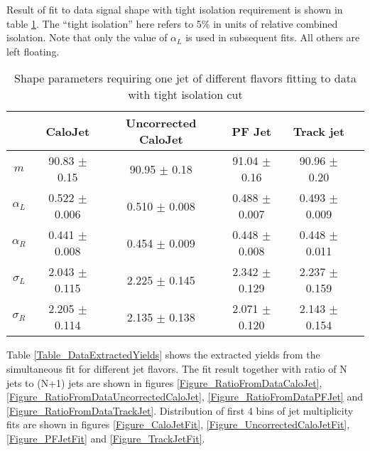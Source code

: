 \documentclass{cmspaper}
\begin{document}

Result of fit to data signal shape with tight isolation requirement is
shown in table \ref{Table_DataAlphaL}.  The ``tight isolation'' here
refers to 5\% in units of relative combined isolation.  Note that only
the value of $\alpha_L$ is used in subsequent fits.  All others are
left floating.

\begin{table}[htbp]
\caption{Shape parameters requiring one jet of different flavors fitting to data with tight isolation cut}
\centering
   \begin{tabular}{|c|c|c|c|c|c|}
      \hline
      & CaloJet & Uncorrected CaloJet & PF Jet & Track jet \\\hline
      $m$ & 90.83 $\pm$ 0.15 & 90.95 $\pm$ 0.18 & 91.04 $\pm$ 0.16 & 90.96 $\pm$ 0.20 \\\hline
      $\alpha_L$ & 0.522 $\pm$ 0.006 & 0.510 $\pm$ 0.008 & 0.488 $\pm$ 0.007 & 0.493 $\pm$ 0.009 \\\hline
      $\alpha_R$ & 0.441 $\pm$ 0.008 & 0.454 $\pm$ 0.009 & 0.448 $\pm$ 0.008 & 0.448 $\pm$ 0.011 \\\hline
      $\sigma_L$ & 2.043 $\pm$ 0.115 & 2.225 $\pm$ 0.145 & 2.342 $\pm$ 0.129 & 2.237 $\pm$ 0.159 \\\hline
      $\sigma_R$ & 2.205 $\pm$ 0.114 & 2.135 $\pm$ 0.138 & 2.071 $\pm$ 0.120 & 2.143 $\pm$ 0.154 \\\hline
   \end{tabular}
   \label{Table_DataAlphaL}
\end{table}

Table \ref{Table_DataExtractedYields} shows the extracted yields from
the simultaneous fit for different jet flavors.  The fit result
together with ratio of N jets to (N+1) jets are shown in figures
\ref{Figure_RatioFromDataCaloJet},
\ref{Figure_RatioFromDataUncorrectedCaloJet},
\ref{Figure_RatioFromDataPFJet} and
\ref{Figure_RatioFromDataTrackJet}.  Distribution of first 4 bins of
jet multiplicity fits are shown in figures \ref{Figure_CaloJetFit},
\ref{Figure_UncorrectedCaloJetFit}, \ref{Figure_PFJetFit} and
\ref{Figure_TrackJetFit}.
\end{document}
